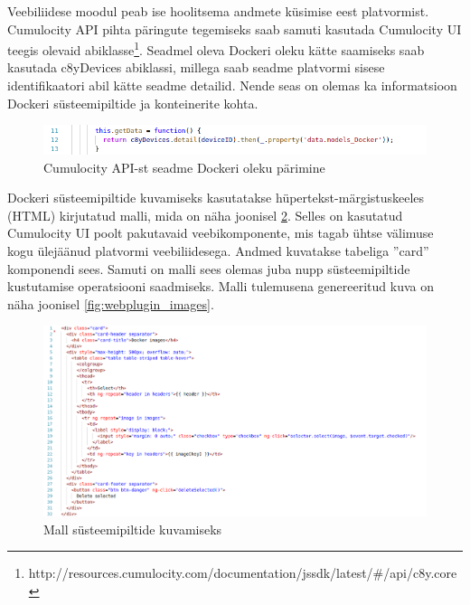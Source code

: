 \documentclass[12pt]{article}
\begin{document}
  \FloatBarrier
 
  Veebiliidese moodul peab ise hoolitsema andmete küsimise eest platvormist. Cumulocity API pihta
  päringute tegemiseks saab samuti kasutada Cumulocity UI teegis olevaid
  abiklasse\footnote{http://resources.cumulocity.com/documentation/jssdk/latest/#/api/c8y.core}.
  Seadmel oleva Dockeri oleku kätte saamiseks saab kasutada c8yDevices abiklassi,
  millega saab seadme platvormi sisese identifikaatori abil kätte seadme detailid. Nende seas
  on olemas ka informatsioon Dockeri süsteemipiltide ja konteinerite kohta.
 
  \begin{figure} [ht] %
  \begin{center}
  \includegraphics[width=1\textwidth]{webplugin_getimages}
  \caption{Cumulocity API-st seadme Dockeri oleku pärimine}
  \label{fig:webplugin_getimages}
  \end{center}
  \end{figure}
  
  \FloatBarrier
 
  Dockeri süsteemipiltide kuvamiseks kasutatakse hüpertekst-märgistuskeeles (HTML) kirjutatud
  malli, mida on näha joonisel \ref{fig:webplugin_images_template}. Selles on kasutatud Cumulocity UI poolt pakutavaid veebikomponente, mis tagab
  ühtse välimuse kogu ülejäänud platvormi veebiliidesega. Andmed
  kuvatakse tabeliga ''card'' komponendi sees. Samuti on malli sees olemas juba nupp süsteemipiltide kustutamise
  operatsiooni saadmiseks. Malli tulemusena genereeritud kuva on näha joonisel \ref{fig:webplugin_images}.
 
  \begin{figure} [ht] %
  \begin{center}
  \includegraphics[width=1\textwidth]{webplugin_images_template}
  \caption{Mall süsteemipiltide kuvamiseks}
  \label{fig:webplugin_images_template}
  \end{center}
  \end{figure}
  
\end{document}
